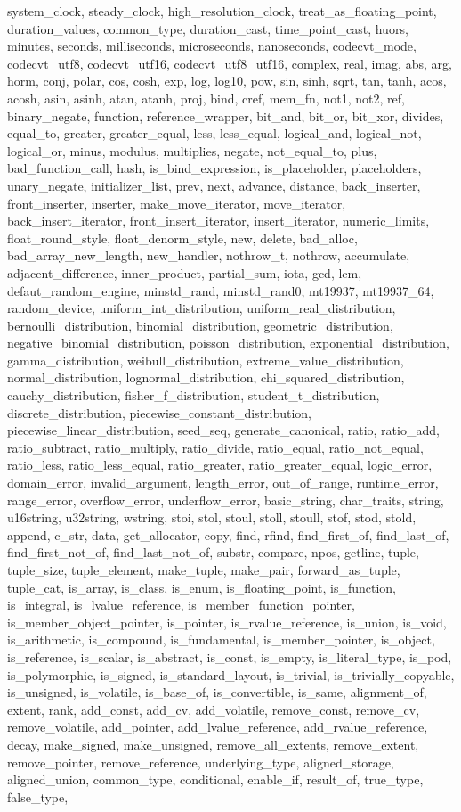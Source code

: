 {{system_clock, steady_clock, high_resolution_clock, treat_as_floating_point, duration_values, common_type, duration_cast, time_point_cast, huors, minutes, seconds, milliseconds, microseconds, nanoseconds, codecvt_mode, codecvt_utf8, codecvt_utf16, codecvt_utf8_utf16, complex, real, imag, abs, arg, horm, conj, polar, cos, cosh, exp, log, log10, pow, sin, sinh, sqrt, tan, tanh, acos, acosh, asin, asinh, atan, atanh, proj, bind, cref, mem_fn, not1, not2, ref, binary_negate, function, reference_wrapper, bit_and, bit_or, bit_xor, divides, equal_to, greater, greater_equal, less, less_equal, logical_and, logical_not, logical_or, minus, modulus, multiplies, negate, not_equal_to, plus, bad_function_call, hash, is_bind_expression, is_placeholder, placeholders, unary_negate, initializer_list, prev, next, advance, distance, back_inserter, front_inserter, inserter, make_move_iterator, move_iterator, back_insert_iterator, front_insert_iterator, insert_iterator, numeric_limits, float_round_style, float_denorm_style, new, delete, bad_alloc, bad_array_new_length, new_handler, nothrow_t, nothrow, accumulate, adjacent_difference, inner_product, partial_sum, iota, gcd, lcm, defaut_random_engine, minstd_rand, minstd_rand0, mt19937, mt19937_64, random_device, uniform_int_distribution, uniform_real_distribution, bernoulli_distribution, binomial_distribution, geometric_distribution, negative_binomial_distribution, poisson_distribution, exponential_distribution, gamma_distribution, weibull_distribution, extreme_value_distribution, normal_distribution, lognormal_distribution, chi_squared_distribution, cauchy_distribution, fisher_f_distribution, student_t_distribution, discrete_distribution, piecewise_constant_distribution, piecewise_linear_distribution, seed_seq, generate_canonical, ratio, ratio_add, ratio_subtract, ratio_multiply, ratio_divide, ratio_equal, ratio_not_equal, ratio_less, ratio_less_equal, ratio_greater, ratio_greater_equal, logic_error, domain_error, invalid_argument, length_error, out_of_range, runtime_error, range_error, overflow_error, underflow_error, basic_string, char_traits, string, u16string, u32string, wstring, stoi, stol, stoul, stoll, stoull, stof, stod, stold, append, c_str, data, get_allocator, copy, find, rfind, find_first_of, find_last_of, find_first_not_of, find_last_not_of, substr, compare, npos, getline, tuple, tuple_size, tuple_element, make_tuple, make_pair, forward_as_tuple, tuple_cat, is_array, is_class, is_enum, is_floating_point, is_function, is_integral, is_lvalue_reference, is_member_function_pointer, is_member_object_pointer, is_pointer, is_rvalue_reference, is_union, is_void, is_arithmetic, is_compound, is_fundamental, is_member_pointer, is_object, is_reference, is_scalar, is_abstract, is_const, is_empty, is_literal_type, is_pod, is_polymorphic, is_signed, is_standard_layout, is_trivial, is_trivially_copyable, is_unsigned, is_volatile, is_base_of, is_convertible, is_same, alignment_of, extent, rank, add_const, add_cv, add_volatile, remove_const, remove_cv, remove_volatile, add_pointer, add_lvalue_reference, add_rvalue_reference, decay, make_signed, make_unsigned, remove_all_extents, remove_extent, remove_pointer, remove_reference, underlying_type, aligned_storage, aligned_union, common_type, conditional, enable_if, result_of, true_type, false_type, }}
